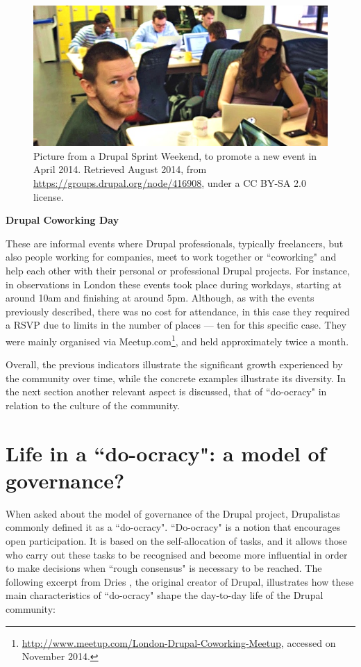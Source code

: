 \begin{figure}[H]
	\centering
	\includegraphics[scale=0.55]{img/events/drupal_coding_sprint.jpg}
	\caption[Drupal Sprint Weekend]%
    {Picture from a Drupal Sprint Weekend, to promote a new event in April 2014. Retrieved  August 2014, from \url{https://groups.drupal.org/node/416908}, under a CC BY-SA 2.0 license.}
	\label{drupal-sprint-weekend}
\end{figure}

\textbf{Drupal Coworking Day}

These are informal events where Drupal professionals, typically freelancers, but also people working for companies, meet to work together or ``coworking" \parencite{spinuzzi2012working} and help each other with their personal or professional Drupal projects. For instance, in observations in London these events took place during workdays, starting at around 10am and finishing at around 5pm. Although, as with the events previously described, there was no cost for attendance, in this case they required a RSVP due to limits in the number of places --- ten for this specific case. They were mainly organised via Meetup.com\footnote{\url{http://www.meetup.com/London-Drupal-Coworking-Meetup}, accessed on  November 2014.}, and held approximately twice a month.

Overall, the previous indicators illustrate the significant growth experienced by the community over time, while the concrete examples illustrate its diversity. In the next section another relevant aspect is discussed, that of ``do-ocracy" in relation to the culture of the community.

\section{Life in a ``do-ocracy": a model of governance?}
\label{sec:do-ocracy}

When asked about the model of governance of the Drupal project, Drupalistas commonly defined it as a ``do-ocracy". ``Do-ocracy" is a notion that encourages open participation. It is based on the self-allocation of tasks, and it allows those who carry out these tasks to be recognised and become more influential in order to make decisions when ``rough consensus" \parencite{russell2006rough} is necessary to be reached. The following excerpt from Dries \parencite[514]{bacon2012art}, the original creator of Drupal, illustrates how these main characteristics of ``do-ocracy" shape the day-to-day life of the Drupal community:

